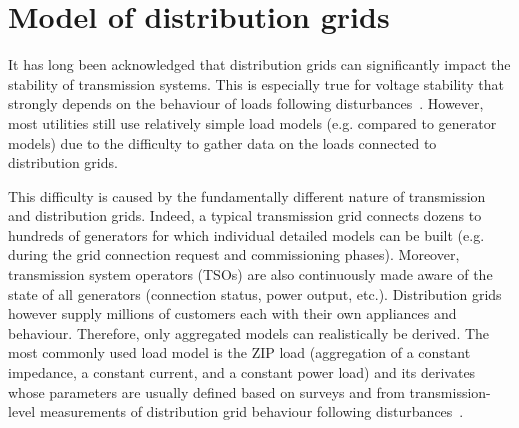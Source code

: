 \chapter{Model of distribution grids}
\label{ch:distrib}
\minitoc

It has long been acknowledged that distribution grids can significantly impact the stability of transmission systems. This is especially true for voltage stability that strongly depends on the behaviour of loads following disturbances~\cite{CutsemBook, kundur}. However, most utilities still use relatively simple load models (e.g. compared to generator models) due to the difficulty to gather data on the loads connected to distribution grids.

This difficulty is caused by the fundamentally different nature of transmission and distribution grids. Indeed, a typical transmission grid connects dozens to hundreds of generators for which individual detailed models can be built (e.g. during the grid connection request and commissioning phases). Moreover, transmission system operators (TSOs) are also continuously made aware of the state of all generators (connection status, power output, etc.). Distribution grids however supply millions of customers each with their own appliances and behaviour. Therefore, only aggregated models can realistically be derived. The most commonly used load model is the ZIP load (aggregation of a constant impedance, a constant current, and a constant power load) and its derivates whose parameters are usually defined based on surveys and from transmission-level measurements of distribution grid behaviour following disturbances~\cite{IndustryLoadModel}.



